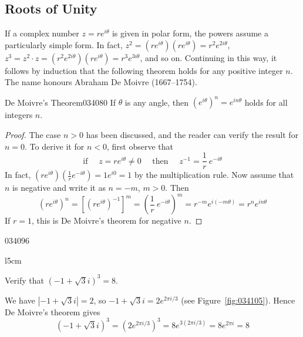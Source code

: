 \subsection*{Roots of Unity}

If a complex number $z = re^{i\theta}$ is given in polar form, the powers assume a particularly simple form. In fact, $z^{2} = (re^{i\theta})(re^{i\theta}) = r^{2}e^{2i\theta}$, $z^{3} = z^{2} \cdot z = (r^{2}e^{2i\theta})(re^{i\theta}) = r^{3}e^{3i\theta}$, and so on. Continuing in this way, it follows by induction that the following theorem holds for any positive integer $n$. The name honours Abraham De Moivre (1667--1754).


\begin{theorem}{De Moivre's Theorem}{034080}
If $\theta$ is any angle, then $(e^{i\theta})^{n} = e^{in\theta}$ holds for all integers $n$.
\end{theorem}

\begin{proof}
The case $n > 0$ has been discussed, and the reader can verify the result for $n = 0$. To derive it for $n < 0$, first observe that
\begin{equation*}
\mbox{if } \quad z = re^{i\theta}\neq 0 \quad \mbox{ then } \quad z^{-1} = \frac{1}{r}~e^{-i\theta}
\end{equation*}
In fact, $(re^{i\theta})(\frac{1}{r} e^{-i\theta}) = 1e^{i0} = 1$ by the multiplication rule. Now assume that $n$ is negative and write it as $n = -m$, $m > 0$. Then
\begin{equation*}
(re^{i\theta})^n = [(re^{i\theta})^{-1}]^m = (\frac{1}{r}~e^{-i\theta})^m = r^{-m} e^{i(-m\theta)}=r^ne^{in\theta}
\end{equation*}
If $r = 1$, this is De Moivre's theorem for negative $n$.
\end{proof}

\begin{example}{}{034096}
\begin{wrapfigure}{l}{5cm}
        \vspace*{-1.5em}
	\centering
	
	\caption{\label{fig:034105}}
\end{wrapfigure}

\setlength{\rightskip}{0pt plus 200pt}
Verify that $(-1+\sqrt{3}i)^3 = 8$.

\begin{solution}
  We have $| -1 + \sqrt{3}i| =2$, so $-1 + \sqrt{3}i = 2e^{2\pi i /3}$ (see Figure~\ref{fig:034105}). Hence De Moivre's theorem gives
\begin{equation*}
(-1+\sqrt{3}i)^3 = (2e^{2\pi i /3})^3 = 8e^{3(2\pi i /3)} = 8e^{2\pi i} = 8
\end{equation*}
\vspace{3em}
\end{solution}
\end{example}

